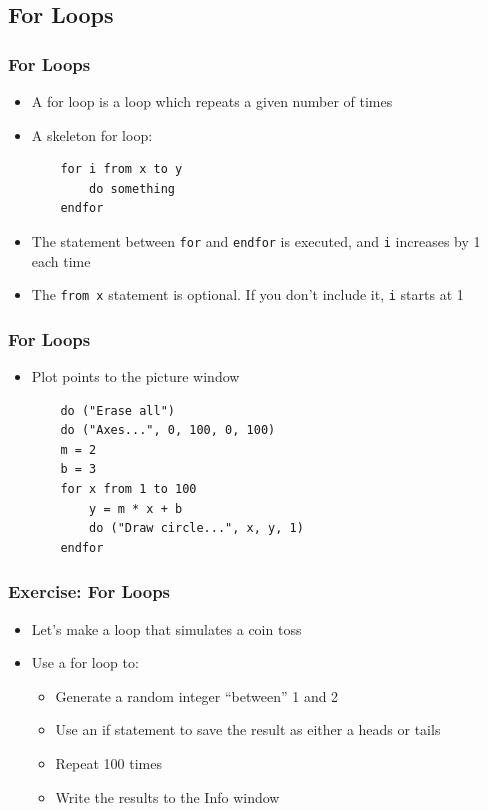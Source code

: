 \documentclass[handout]{beamer}
\begin{document}
\subsection{For Loops}

\begin{frame}[fragile]
\frametitle{For Loops}

\begin{itemize}
    \item <1-> A for loop is a loop which repeats a given number of times

    \item <1-> A skeleton for loop:
    \begin{verbatim}
    for i from x to y
        do something
    endfor
    \end{verbatim}

    \item <2-> The statement between \texttt{for} and \texttt{endfor} is executed, and \texttt{i} increases by 1 each time

    \item <3-> The \texttt{from x} statement is optional. If you don't include it, \texttt{i} starts at 1    

\end{itemize}  
\end{frame}

\begin{frame}[fragile]
\frametitle{For Loops}

\begin{itemize}
    \item <1-> Plot points to the picture window

    \begin{verbatim}
    do ("Erase all")
    do ("Axes...", 0, 100, 0, 100)
    m = 2
    b = 3
    for x from 1 to 100
        y = m * x + b
        do ("Draw circle...", x, y, 1)
    endfor
    \end{verbatim}

\end{itemize}  
\end{frame}

\begin{frame}[fragile]
\frametitle{Exercise: For Loops}

\begin{itemize}
    \item <1-> Let's make a loop that simulates a coin toss
    \item <1-> Use a for loop to:
    \begin{itemize}
        \item Generate a random integer ``between'' 1 and 2
        \item Use an if statement to save the result as either a heads or tails
        \item Repeat 100 times
        \item Write the results to the Info window
    \end{itemize}

\end{itemize}  
\end{frame}
\end{document}
